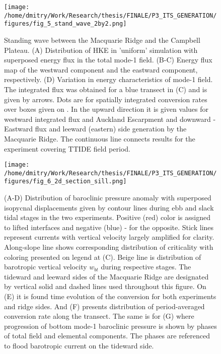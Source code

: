 \documentclass[12pt]{article}
\newcommand{\SCALEO}{2}
\begin{document}
\begin{figure}
	\centering
	\texttt{[image: /home/dmitry/Work/Research/thesis/FINALE/P3\_ITS\_GENERATION/figures/fig\_5\_stand\_wave\_2by2.png]}
	\caption{Standing wave between the Macquarie Ridge and the Campbell Plateau. (A) Distribution 
	of HKE in 'uniform' simulation with superposed energy flux in the total mode-1 field. (B-C) 
	Energy flux map of the westward component and the eastward component, respectively. (D) 
	Variation in energy characteristics of mode-1 field. The integrated flux was obtained for a 	
	blue transect in (C) and is given by arrows. Dots are for spatially integrated conversion rates 
	over boxes given on . In the upward direction it is given values for 
	westward integrated flux and Auckland Escarpment and downward - Eastward flux and leeward 
	(eastern) side generation by the Macquarie Ridge. The continuous line connects results for the 
	experiment covering TTIDE field period.}
	\label{C3.fig:stand_wave}
\end{figure}

\begin{figure}
	\centering
	\texttt{[image: /home/dmitry/Work/Research/thesis/FINALE/P3\_ITS\_GENERATION/figures/fig\_6\_2d\_section\_sill.png]}
	\caption{(A-D) Distribution of baroclinic pressure anomaly with superposed isopycnal 
	displacements given by contour lines during ebb and slack tidal stages in the two experiments. 
	Positive (red) color is assigned to lifted interfaces and negative (blue) - for the opposite. 
	Stick lines represent currents with vertical velocity largely amplified for clarity. 
	Along-slope line shows corresponding distribution of criticality with coloring presented on 
	legend at (C). Beige line is distribution of barotropic vertical velocity $w_{bt}$ during 
	respective stages. The tideward and leeward sides of the Macquarie Ridge are designated by 
	vertical solid and dashed lines used throughout this figure. On (E) it is found time evolution 
	of the conversion for both experiments and ridge sides. And (F) presents distribution of 
	period-averaged conversion rate along the transect. The same is for (G) where progression of 
	bottom mode-1 baroclinic pressure is shown by phases of total field and elemental 
	components. The phases are referenced to flood barotropic current on the tideward side.}
	\label{C3.fig:gen_2d}
\end{figure}
\end{document}
